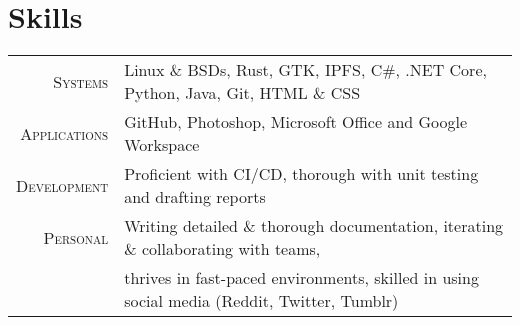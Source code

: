 \documentclass[a4paper,10pt]{article} %
\begin{document}

\section{Skills}

\begin{tabular}{rl}
\textsc{Systems} & Linux \& BSDs, Rust, GTK, IPFS, C\#, .NET Core, Python, Java, Git, HTML \& CSS\\
\textsc{Applications} & GitHub, Photoshop, Microsoft Office and Google Workspace\\
\textsc{Development} & Proficient with CI/CD, thorough with unit testing and drafting reports\\
\textsc{Personal} & Writing detailed \& thorough documentation, iterating \& collaborating with teams,\\& thrives in fast-paced environments, skilled in using social media \footnotesize(Reddit, Twitter, Tumblr)\normalsize\\

\end{tabular}
\end{document}
